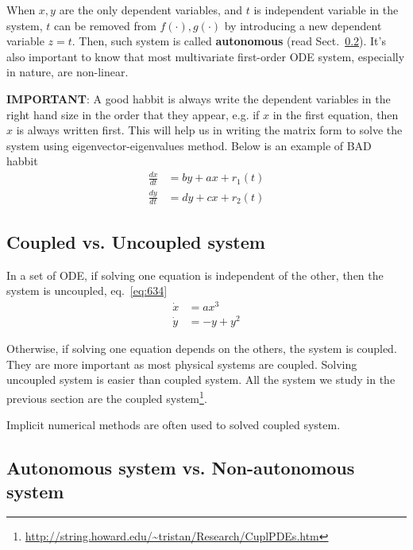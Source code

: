 \begin{framed}

When $x,y$ are the only dependent variables, and $t$ is independent variable in
the system, $t$ can be removed from $f(\cdot),g(\cdot)$ by introducing a new
dependent variable $z=t$. Then, such system is called {\bf autonomous} (read
Sect.~\ref{sec:auton-syst-vs}). It's also important to know that most
multivariate first-order ODE system, especially in nature, are non-linear.
\end{framed}

{\bf IMPORTANT}: A good habbit is always write the dependent variables
in the right hand size in the order that they appear, e.g. if $x$ in
the first equation, then $x$ is always written first. This will help us in
writing the matrix form to solve the system using eigenvector-eigenvalues
method. Below is an example of BAD habbit
\begin{equation*}
  \begin{split}
    \frac{dx}{dt} &= by+ax+r_1(t) \\
    \frac{dy}{dt} &= dy+cx+r_2(t)
  \end{split}    
\end{equation*}

\subsection{Coupled vs. Uncoupled system}
\label{sec:coupled-vs.-uncoupled}

In a set of ODE, if solving one equation is independent of the other,
then the system is uncoupled, eq.~\eqref{eq:634}
\begin{equation}
  \label{eq:634}
  \begin{split}
    \dot{x} &= ax^3 \\
    \dot{y} &= -y + y^2
  \end{split}
\end{equation}

Otherwise, if solving one equation depends on the others, the system is coupled.
They are more important as most physical systems are coupled.
Solving uncoupled system is easier than coupled system. All the system we study
in the previous section are the coupled
system\footnote{\url{http://string.howard.edu/~tristan/Research/CuplPDEs.htm}}.

Implicit numerical methods are often used to solved coupled system.

\subsection{Autonomous system vs. Non-autonomous system}
\label{sec:auton-syst-vs}


